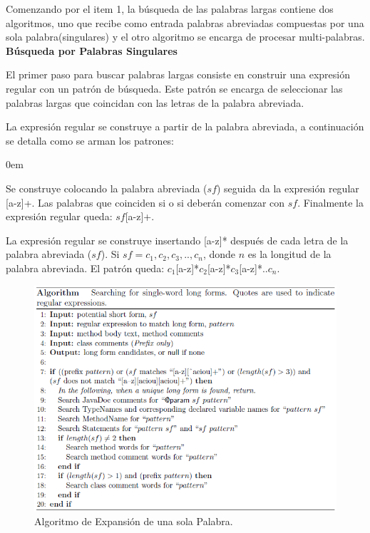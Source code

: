 \documentclass[12pt]{report}
\begin{document}
Comenzando por el item 1, la búsqueda de las palabras largas contiene dos algoritmos, uno que recibe como entrada palabras abreviadas compuestas por una sola palabra(singulares) y el otro algoritmo se encarga de procesar multi-palabras.\\

\noindent \textbf{Búsqueda por Palabras Singulares\\}

El primer paso para buscar palabras largas consiste en construir una expresión regular con un patrón de búsqueda.  Este patrón se encarga de seleccionar las palabras largas que coincidan con las letras de la palabra abreviada.

La expresión regular se construye a partir de la palabra abreviada, a continuación se detalla como se arman los patrones: 

\begin{description}
\itemsep0em%
\item[Patrón prefijo:] Se construye colocando la palabra abreviada ($sf$) seguida da la expresión regular [a-z]+. Las palabras que coinciden si o si deberán comenzar con $sf$. Finalmente la expresión regular queda: $sf$[a-z]+.

\item[Patrón compuesto por letras:]  La expresión regular se construye insertando [a-z]* después de cada letra de la palabra abreviada ($sf$). Si $sf=c_{1},c_{2},c_{3},..,c_{n}$, donde $n$ es la longitud de la palabra abreviada. El patrón queda: $c_{1}$[a-z]*$c_{2}$[a-z]*$c_{3}$[a-z]*..$c_{n}$.
\end{description}


\begin{figure}[h] %
\centering
\includegraphics[scale=0.8]{./exp_1.png}
\caption{Algoritmo de Expansión de una sola Palabra.}
\label{exp1}
\end{figure}
\end{document}
